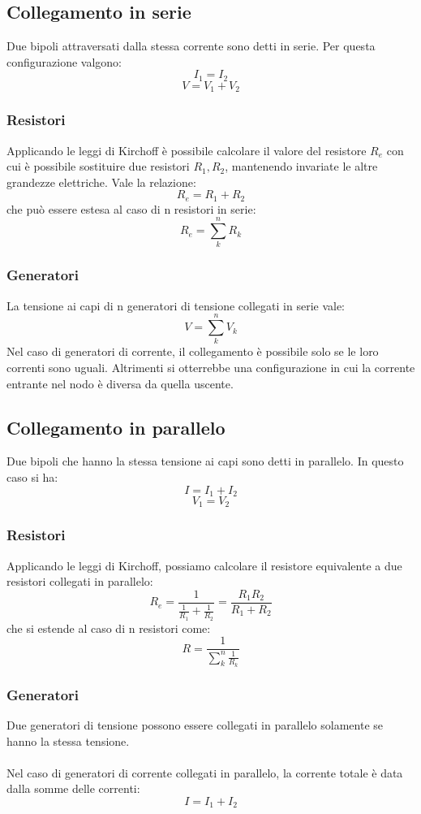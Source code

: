 \documentclass{article}
\begin{document}
\subsection{Collegamento in serie}
Due bipoli attraversati dalla stessa corrente sono detti in serie.
Per questa configurazione valgono:
$$ I_1=I_2 $$
$$ V=V_1+V_2 $$

\subsubsection{Resistori}
Applicando le leggi di Kirchoff è possibile calcolare il valore del resistore $R_e$ con cui è possibile sostituire due resistori $R_1,R_2$, mantenendo invariate le altre grandezze elettriche. Vale la relazione:
$$ R_e=R_1+R_2 $$
che può essere estesa al caso di n resistori in serie:
$$ R_e=\sum_k^nR_k $$

\subsubsection{Generatori}
La tensione ai capi di n generatori di tensione collegati in serie vale:
$$ V=\sum_k^nV_k $$
Nel caso di generatori di corrente, il collegamento è possibile solo se le loro correnti sono uguali. Altrimenti si otterrebbe una configurazione in cui la corrente entrante nel nodo è diversa da quella uscente.


\subsection{Collegamento in parallelo}
Due bipoli che hanno la stessa tensione ai capi sono detti in parallelo.
In questo caso si ha:
$$ I=I_1+I_2 $$
$$ V_1=V_2 $$

\subsubsection{Resistori}
Applicando le leggi di Kirchoff, possiamo calcolare il resistore equivalente a due resistori collegati in parallelo:
$$ R_e= \frac{1}{\frac{1}{R_1}+\frac{1}{R_2}}=\frac{R_1R_2}{R_1+R_2}$$
che si estende al caso di n resistori come:
$$ R=\frac{1}{\sum_k^n\frac{1}{R_k}} $$

\subsubsection{Generatori}
Due generatori di tensione possono essere collegati in parallelo solamente se hanno la stessa tensione.\\\\
Nel caso di generatori di corrente collegati in parallelo, la corrente totale è data dalla somme delle correnti:
$$ I=I_1+I_2 $$
\end{document}
